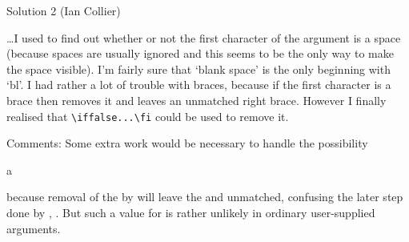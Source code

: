 \begin{solution}{Solution 2 (Ian Collier)}

\ldots I used \cmd{\meaning} to find out whether or not the
first character of the argument is a space (because spaces are usually
ignored and this seems to be the only way to make the space visible).
I'm fairly sure that `blank space' is the only \cmd{\meaning} beginning with
`bl'.  I had rather a lot of trouble with braces, because if the first
character is a brace then \cmd{\meaning} removes it and leaves an unmatched
right brace.  However I finally realised that \verb?\iffalse...\fi? could be
used to remove it.

Comments: Some extra work would be necessary to handle the possibility
\begin{lcode}
  \def\text{\iftrue a\else b\fi}
  \trimspaces\text
\end{lcode}
because removal of the  by \cmd{\meaning} will leave the 
 and  unmatched, confusing the later  
step done by \cmd{\tr@b}, \cmd{\tr@c}.
But such a value for \cmd{\text} is rather unlikely in ordinary
user-supplied arguments.
\end{solution}

